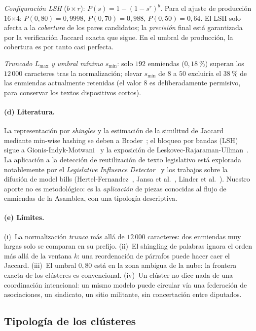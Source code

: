 \emph{Configuración LSH} ($b\times r$): $P(s)=1-(1-s^r)^b$. Para el ajuste de
producción 16$\times$4: $P(0{,}80)=0{,}9998$, $P(0{,}70)=0{,}988$, $P(0{,}50)=0{,}64$.
El LSH solo afecta a la \emph{cobertura} de los pares candidatos; la
\emph{precisión} final está garantizada por la verificación Jaccard exacta que
sigue. En el umbral de producción, la cobertura es por tanto casi perfecta.

\emph{Truncado $L_{\max}$ y umbral mínimo $s_{\min}$}: solo $192$ enmiendas
($0{,}18~\%$) superan los $12\,000$ caracteres tras la normalización; elevar
$s_{\min}$ de $8$ a $50$ excluiría el $38~\%$ de las enmiendas actualmente retenidas
(el valor $8$ es deliberadamente permisivo, para conservar los textos dispositivos
cortos).

\paragraph{(d) Literatura.} La representación por \emph{shingles} y la estimación de
la similitud de Jaccard mediante min-wise hashing se deben a
Broder~\cite{broder1997,broder2000}; el bloqueo por bandas (LSH) sigue a
Gionis-Indyk-Motwani~\cite{gionis1999} y la exposición de
Leskovec-Rajaraman-Ullman~\cite{lru2014}. La aplicación a la detección de
reutilización de texto legislativo está explorada notablemente por el
\emph{Legislative Influence Detector}~\cite{burgess2016} y los trabajos sobre la
difusión de \og{}model bills\fg{} (Hertel-Fernandez~\cite{hf2014},
Jansa et al.~\cite{jansa2019}, Linder et al.~\cite{linder2020}). Nuestro aporte no
es metodológico: es la \emph{aplicación} de piezas conocidas al flujo de enmiendas
de la Asamblea, con una tipología descriptiva.

\paragraph{(e) Límites.} (i)~La normalización \emph{trunca} más allá de $12\,000$
caracteres: dos enmiendas muy largas solo se comparan en su prefijo. (ii)~El
shingling de palabras ignora el orden más allá de la ventana $k$: una reordenación
de párrafos puede hacer caer el Jaccard. (iii)~El umbral $0{,}80$ está en la zona
ambigua de la nube: la frontera exacta de los clústeres es convencional. (iv)~Un
\og{}clúster\fg{} no dice nada de una coordinación intencional: un mismo modelo
puede circular vía una federación de asociaciones, un sindicato, un sitio
militante, sin concertación entre diputados.

\subsection{Tipología de los clústeres}\label{sec:typo-es}

